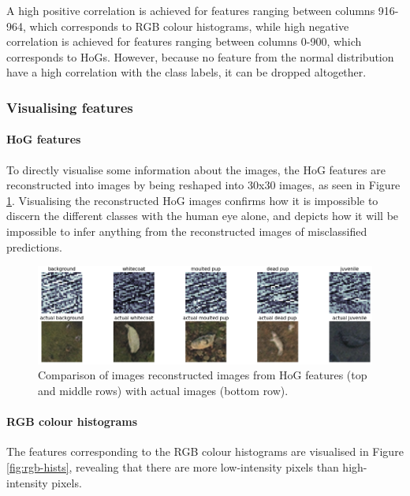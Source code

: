 \documentclass[letterpaper,12pt]{article}
\begin{document}
A high positive correlation is achieved for features ranging between columns 916-964, which corresponds to RGB colour histograms, while high negative correlation is achieved for features ranging between columns 0-900, which corresponds to HoGs. However, because no feature from the normal distribution have a high correlation  with the class labels, it can be dropped altogether.

\subsubsection{Visualising features}

\paragraph{HoG features}

To directly visualise some information about the images, the HoG features are reconstructed into images by being reshaped into 30x30 images, as seen in Figure \ref{fig:hog_multi}. Visualising the reconstructed HoG images confirms how it is impossible to discern the different classes with the human eye alone, and depicts how it will be impossible to infer anything from the reconstructed images of misclassified predictions.

\begin{figure}[h]
\centerline{\includegraphics[width=\textwidth]{report/figures/hog_multi.png}}
\caption{\label{fig:hog_multi}Comparison of images reconstructed images from HoG features (top and middle rows) with actual images (bottom row).}
\end{figure}

\paragraph{RGB colour histograms}

The features corresponding to the RGB colour histograms are visualised in Figure \ref{fig:rgb-hists}, revealing that there are more low-intensity pixels than high-intensity pixels.\\
\end{document}
